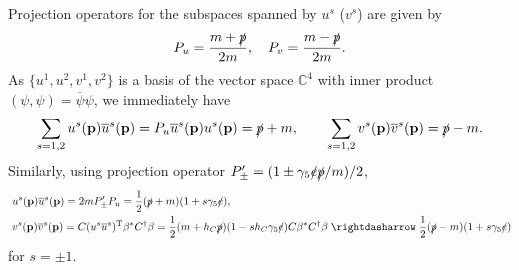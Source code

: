 \documentclass{CheatSheet}
\begin{document}
Projection operators for the subspaces spanned by $u^s$ ($v^s$) are given by
\begin{equation}
 P_u=\frac{m+\slashed p}{2m}, \quad P_v=\frac{m-\slashed p}{2m}.
\end{equation}
As $\{u^1, u^2, v^1, v^2\}$ is a basis of the vector space $\mathbb C^4$ with inner product $(\psi,\psi)=\overline\psi\psi$, we immediately have 
\begin{equation}
 \sum_{s=1,2}u^s({\mathbf{p}})\overline u^s({\mathbf{p}})=P_u \overline u^s({\mathbf{p}})u^s({\mathbf{p}}) = \slashed p+m,\qquad
 \sum_{s=1,2}v^s({\mathbf{p}})\overline v^s({\mathbf{p}})=\slashed p-m.
\end{equation}
Similarly, using projection operator $P'_{\pm}=(1\pm\gamma_5\slashed e\slashed p/m)/2$,
\begin{align}
 &u^s(\vc p)\overline u^s(\vc p) = 2m P'_{\pm}P_u = \frac12(\slashed p+m)(1+s\gamma_5\slashed e),\\\
 &v^s(\vc p)\overline v^s(\vc p) = C(u^s\overline u^s)^\TT \beta^*C^\dagger\beta
=\frac12(m+h_C \slashed p)(1-s h_C \gamma_5\slashed e )C\beta^*C^\dagger \beta
\leadsto
\frac12(\slashed p-m)(1+s\gamma_5\slashed e)
\end{align}
for $s=\pm1$.
\end{document}

